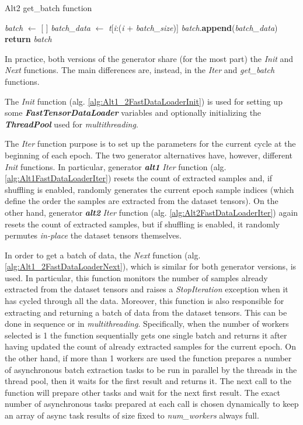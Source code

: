 \documentclass[pdfa%
,cucitura%
]{toptesi}
\begin{document}
\begin{algorithm}[h!]
	\caption{Alt2 get\_batch function}\label{alg:Alt2GetBatch}
	\begin{algorithmic}[1]
		\State \textit{batch} $\gets$ [ ]
		\State \textit{batch\_data} $\gets$ \textit{t}[\textit{i}:(\textit{i} + \textit{batch\_size})]
		\State \textit{batch}.\textbf{append}(\textit{batch\_data})
		\EndFor
		\State
		\State \textbf{return} \textit{batch}
		\EndFunction
	\end{algorithmic}
\end{algorithm}

In practice, both versions of the generator share (for the most part) the \textit{Init} and \textit{Next} functions. The main differences are, instead, in the \textit{Iter} and \textit{get\_batch} functions.

The \textit{Init} function (alg. \ref{alg:Alt1_2FastDataLoaderInit}) is used for setting up some \textit{\textbf{FastTensorDataLoader}} variables and optionally initializing the \textit{\textbf{ThreadPool}} used for \textit{multithreading}.

The \textit{Iter} function purpose is to set up the parameters for the current cycle at the beginning of each epoch. The two generator alternatives have, however, different \textit{Init} functions. In particular, generator \textit{\textbf{alt1}} \textit{Iter} function (alg. \ref{alg:Alt1FastDataLoaderIter}) resets the count of extracted samples and, if shuffling is enabled, randomly generates the current epoch sample indices (which define the order the samples are extracted from the dataset tensors). On the other hand, generator \textit{\textbf{alt2}} \textit{Iter} function (alg. \ref{alg:Alt2FastDataLoaderIter}) again resets the count of extracted samples, but if shuffling is enabled, it randomly permutes \textit{in-place} the dataset tensors themselves.

In order to get a batch of data, the \textit{Next} function (alg. \ref{alg:Alt1_2FastDataLoaderNext}), which is similar for both generator versions, is used. In particular, this function monitors the number of samples already extracted from the dataset tensors and raises a \textit{StopIteration} exception when it has cycled through all the data. Moreover, this function is also responsible for extracting and returning a batch of data from the dataset tensors. This can be done in sequence or in \textit{multithreading}. Specifically, when the number of workers selected is 1 the function sequentially gets one single batch and returns it after having updated the count of already extracted samples for the current epoch. On the other hand, if more than 1 workers are used the function prepares a number of asynchronous batch extraction tasks to be run in parallel by the threads in the thread pool, then it waits for the first result and returns it. The next call to the function will prepare other tasks and wait for the next first result. The exact number of asynchronous tasks prepared at each call is chosen dynamically to keep an array of async task results of size fixed to \textit{num\_workers} always full.
\end{document}
